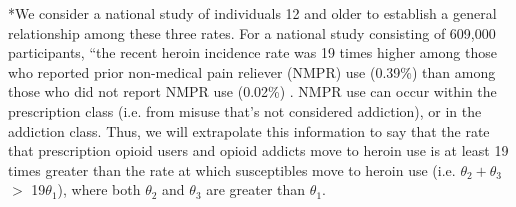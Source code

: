 \documentclass[12pt]{article}
\begin{document}
*We consider a national study of individuals 12 and older to establish a general relationship among these three rates. For a national study consisting of 609,000 participants, ``the recent heroin incidence rate was 19 times higher among those who reported prior non-medical pain reliever (NMPR) use (0.39\%) than among those who did not report NMPR use (0.02\%) \cite{Muhuri}.
NMPR use can occur within the prescription class (i.e. from misuse that's not considered addiction), or in the addiction class. Thus, we will extrapolate this information to say that the rate that prescription opioid users and opioid addicts move to heroin use is at least 19 times greater than the rate at which susceptibles move to heroin use (i.e. $\theta_2 + \theta_3$ $>$ 19$\theta_1$), where both $\theta_2$ and $\theta_3$ are greater than $\theta_1.$ 


\pagebreak
\end{document}
